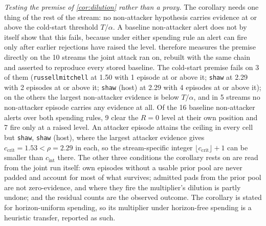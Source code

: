 \emph{Testing the premise of \cref{cor:dilution} rather than a proxy.} The corollary needs one thing of
the rest of the stream: no non-attacker hypothesis carries evidence at or above the cold-start
threshold $T/\alpha$. A baseline non-attacker alert does not by itself show that this fails, because
under either spending rule an alert can fire only after earlier rejections have raised the level.
 therefore measures the premise directly on the 10 streams the joint
attack ran on, rebuilt with the same chain and asserted to reproduce every stored baseline. The
cold-start premise fails on 3 of them (\texttt{russellmitchell} at 1.50 with 1 episode at or above it; \texttt{shaw} at 2.29 with 2 episodes at or above it; \texttt{shaw} (host) at 2.29 with 4 episodes at or above it); on the others
the largest non-attacker evidence is below $T/\alpha$, and in 5 streams no
non-attacker episode carries any evidence at all. Of the 16 baseline non-attacker
alerts over both spending rules, 9 clear the $R=0$ level at their own position and
7 fire only at a raised level. An attacker episode attains the ceiling in every cell but \texttt{shaw}, \texttt{shaw} (host), where the largest attacker evidence gives $c_{\mathrm{crit}}=1.53<\rho=2.29$ in each, so the stream-specific integer $\lfloor c_{\mathrm{crit}}\rfloor+1$ can be smaller than $c_{\mathrm{int}}$ there.
The other three conditions the corollary rests on are read from the joint run itself: own episodes
without a usable prior pool are never padded and account for most of what survives; admitted pads
from the prior pool are not zero-evidence, and where they fire the multiplier's dilution is partly
undone; and the residual counts are the observed outcome. The corollary is stated for horizon-uniform
spending, so its multiplier under horizon-free spending is a heuristic transfer, reported as such.
